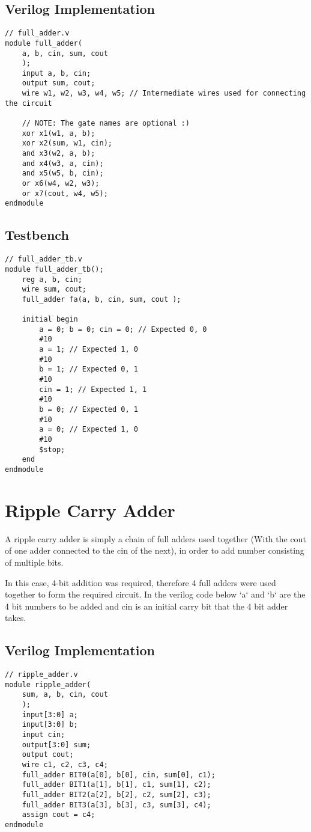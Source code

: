 \documentclass[a4paper]{article}
\begin{document}
\subsection{Verilog Implementation}
\begin{verbatim}
// full_adder.v
module full_adder(
    a, b, cin, sum, cout
    );
    input a, b, cin;
    output sum, cout;
    wire w1, w2, w3, w4, w5; // Intermediate wires used for connecting the circuit

    // NOTE: The gate names are optional :)
    xor x1(w1, a, b);
    xor x2(sum, w1, cin);
    and x3(w2, a, b);
    and x4(w3, a, cin);
    and x5(w5, b, cin);
    or x6(w4, w2, w3);
    or x7(cout, w4, w5);
endmodule
\end{verbatim}
\subsection{Testbench}
\begin{verbatim}
// full_adder_tb.v
module full_adder_tb();
    reg a, b, cin;
    wire sum, cout;
    full_adder fa(a, b, cin, sum, cout );
    
    initial begin
        a = 0; b = 0; cin = 0; // Expected 0, 0
        #10
        a = 1; // Expected 1, 0
        #10
        b = 1; // Expected 0, 1
        #10
        cin = 1; // Expected 1, 1
        #10
        b = 0; // Expected 0, 1
        #10
        a = 0; // Expected 1, 0
        #10
        $stop;
    end
endmodule
\end{verbatim}

\pagebreak

\section{Ripple Carry Adder}
A ripple carry adder is simply a chain of full adders used together (With the cout of one adder connected to the cin of the next), in order to add number consisting of multiple bits. 

In this case, 4-bit addition was required, therefore 4 full adders were used together to form the required circuit. In the verilog code below `a` and `b` are the 4 bit numbers to be added and cin is an initial carry bit that the 4 bit adder takes.
\subsection{Verilog Implementation}
\begin{verbatim}
// ripple_adder.v
module ripple_adder(
    sum, a, b, cin, cout
    );
    input[3:0] a;
    input[3:0] b;
    input cin;
    output[3:0] sum;
    output cout;
    wire c1, c2, c3, c4;
    full_adder BIT0(a[0], b[0], cin, sum[0], c1);
    full_adder BIT1(a[1], b[1], c1, sum[1], c2);
    full_adder BIT2(a[2], b[2], c2, sum[2], c3);
    full_adder BIT3(a[3], b[3], c3, sum[3], c4);
    assign cout = c4;
endmodule
\end{verbatim}
\end{document}
